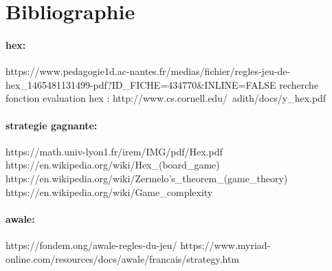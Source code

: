 \section{Bibliographie}





\paragraph {hex:}
https://www.pedagogie1d.ac-nantes.fr/medias/fichier/regles-jeu-de-hex_1465481131499-pdf?ID_FICHE=434770&INLINE=FALSE
recherche fonction evaluation hex :
http://www.cs.cornell.edu/~adith/docs/y_hex.pdf

\paragraph {strategie gagnante:}
https://math.univ-lyon1.fr/irem/IMG/pdf/Hex.pdf
https://en.wikipedia.org/wiki/Hex_(board_game)
https://en.wikipedia.org/wiki/Zermelo's_theorem_(game_theory)
https://en.wikipedia.org/wiki/Game_complexity

\paragraph {awale:}
https://fondem.ong/awale-regles-du-jeu/
https://www.myriad-online.com/resources/docs/awale/francais/strategy.htm
